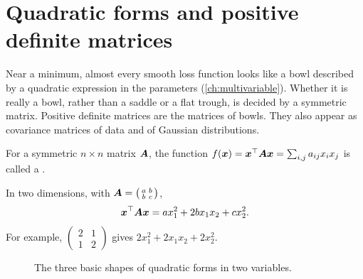 \section{Quadratic forms and positive definite matrices}\label{sec:positive-definite}

\begin{motivation}
Near a minimum, almost every smooth loss function looks like a bowl described
by a quadratic expression in the parameters (\cref{ch:multivariable}). Whether
it is really a bowl, rather than a saddle or a flat trough, is decided by a
symmetric matrix. Positive definite matrices are the matrices of bowls. They
also appear as covariance matrices of data and of Gaussian distributions.
\end{motivation}

\begin{definition}\label{def:quadratic-form}
For a symmetric $n\times n$ matrix $\bm{A}$, the function
$f(\bm{x}) = \bm{x}^\top\bm{A}\bm{x} = \sum_{i,j} a_{ij}x_ix_j$ is called a
.
\end{definition}

In two dimensions, with $\bm{A} = \left(\begin{smallmatrix} a & b\\ b &
c\end{smallmatrix}\right)$,
\[
  \bm{x}^\top\bm{A}\bm{x} = ax_1^2 + 2bx_1x_2 + cx_2^2 .
\]
For example, $\left(\begin{smallmatrix} 2 & 1\\ 1 & 2\end{smallmatrix}\right)$
gives $2x_1^2 + 2x_1x_2 + 2x_2^2$.

\begin{figure}[htbp]
\centering
{}
\caption{The three basic shapes of quadratic forms in two variables.}
\label{fig:quadratic-forms}
\end{figure}

